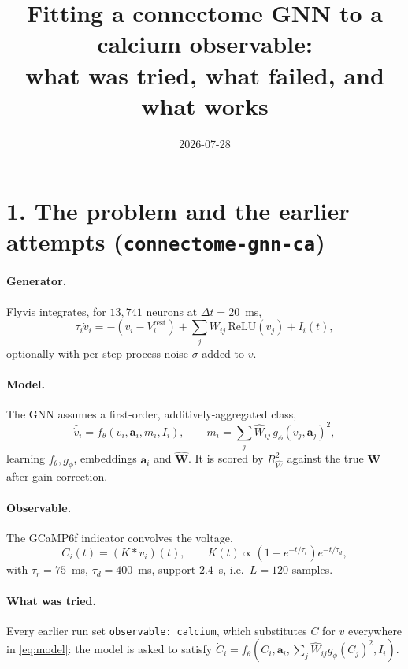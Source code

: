 \documentclass[10pt]{article}
\title{\vspace{-2.5em}Fitting a connectome GNN to a calcium observable:\\
what was tried, what failed, and what works}
\date{2026-07-28}
\author{}
\newcommand{\Rw}{R^2_{\widehat W}}
\newcommand{\Mat}[1]{\mathbf{#1}}
\begin{document}
\maketitle
\vspace{-3em}

\section*{1. The problem and the earlier attempts (\texttt{connectome-gnn-ca})}

\paragraph{Generator.} Flyvis integrates, for $13{,}741$ neurons at $\Delta t = 20$~ms,
\begin{equation}
\tau_i \dot v_i = -(v_i - V^{\mathrm{rest}}_i) + \textstyle\sum_j W_{ij}\,\mathrm{ReLU}(v_j) + I_i(t),
\label{eq:gen}
\end{equation}
optionally with per-step process noise $\sigma$ added to $v$.

\paragraph{Model.} The GNN assumes a first-order, additively-aggregated class,
\begin{equation}
\widehat{\dot v}_i = f_\theta\!\left(v_i, \Mat{a}_i, m_i, I_i\right),
\qquad
m_i = \textstyle\sum_j \widehat W_{ij}\, g_\phi(v_j, \Mat{a}_j)^2 ,
\label{eq:model}
\end{equation}
learning $f_\theta, g_\phi$, embeddings $\Mat{a}_i$ and $\widehat{\Mat{W}}$. It is
scored by $\Rw$ against the true $\Mat{W}$ after gain correction.

\paragraph{Observable.} The GCaMP6f indicator convolves the voltage,
\begin{equation}
C_i(t) = (K * v_i)(t), \qquad
K(t) \propto \left(1 - e^{-t/\tau_r}\right) e^{-t/\tau_d},
\label{eq:kernel}
\end{equation}
with $\tau_r = 75$~ms, $\tau_d = 400$~ms, support $2.4$~s, i.e.\ $L = 120$ samples.

\paragraph{What was tried.} Every earlier run set \texttt{observable: calcium},
which substitutes $C$ for $v$ everywhere in \eqref{eq:model}: the model is asked
to satisfy $\dot C_i = f_\theta(C_i, \Mat{a}_i, \sum_j \widehat W_{ij} g_\phi(C_j)^2, I_i)$.
\end{document}
